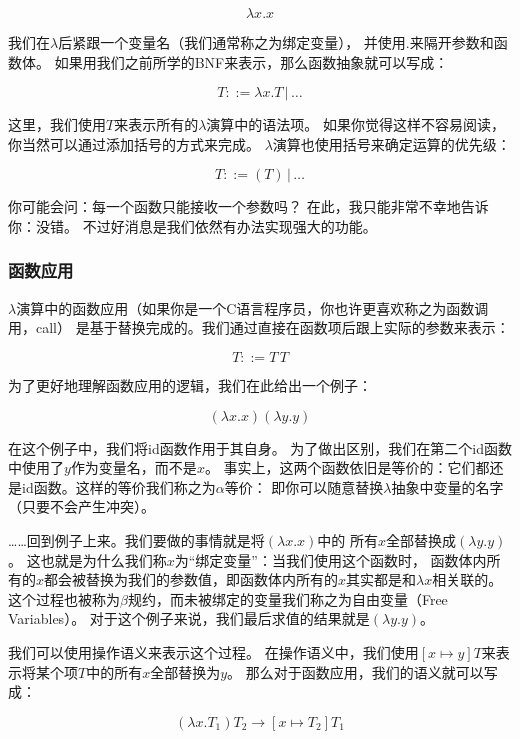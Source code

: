 \documentclass[../main.tex]{subfiles}
\begin{document}
      $$\lambda x. x$$
      
      \indent 我们在$\lambda$后紧跟一个变量名（我们通常称之为绑定变量），
      并使用$.$来隔开参数和函数体。
      如果用我们之前所学的BNF来表示，那么函数抽象就可以写成：

      $$T ::= \lambda x. T\, | \, \dots$$

      \indent 这里，我们使用$T$来表示所有的$\lambda$演算中的语法项。
      如果你觉得这样不容易阅读，你当然可以通过添加括号的方式来完成。
      $\lambda$演算也使用括号来确定运算的优先级：

      $$T ::= (T)\, | \, \dots$$

      \indent 你可能会问：每一个函数只能接收一个参数吗？
      在此，我只能非常不幸地告诉你：没错。
      不过好消息是我们依然有办法实现强大的功能。

    \subsubsection*{函数应用}
      \indent $\lambda$演算中的函数应用（如果你是一个C语言程序员，你也许更喜欢称之为函数调用，call）
      是基于替换完成的。我们通过直接在函数项后跟上实际的参数来表示：

      $$T ::= T\, T$$

      \indent 为了更好地理解函数应用的逻辑，我们在此给出一个例子：

      $$(\lambda x. x) (\lambda y. y)$$

      \indent 在这个例子中，我们将id函数作用于其自身。
      为了做出区别，我们在第二个id函数中使用了$y$作为变量名，而不是$x$。
      事实上，这两个函数依旧是等价的：它们都还是id函数。这样的等价我们称之为$\alpha$等价：
      即你可以随意替换$\lambda$抽象中变量的名字（只要不会产生冲突）\cite{lamwiki}。

      \indent ……回到例子上来。我们要做的事情就是将$(\lambda x. x)$中的
      所有$x$全部替换成$(\lambda y. y)$。
      这也就是为什么我们称$x$为“绑定变量”：当我们使用这个函数时，
      函数体内所有的$x$都会被替换为我们的参数值，即函数体内所有的$x$其实都是和$\lambda x$相关联的。
      这个过程也被称为$\beta$规约\cite{lamwiki}，而未被绑定的变量我们称之为自由变量（Free Variables）。
      对于这个例子来说，我们最后求值的结果就是$(\lambda y. y)$。

      \indent 我们可以使用操作语义来表示这个过程。
      在操作语义中，我们使用$[x \mapsto y]T$来表示将某个项$T$中的所有$x$全部替换为$y$。
      那么对于函数应用，我们的语义就可以写成：

      $$(\lambda x. T_1) T_2 \to [x \mapsto T_2]T_1$$
\end{document}
